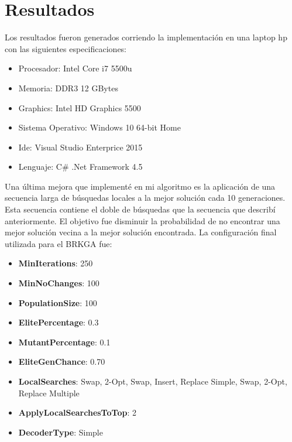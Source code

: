 \chapter{Resultados}

Los resultados fueron generados corriendo la implementación en una laptop hp con las siguientes especificaciones:

\begin{itemize}
  \item Procesador: Intel Core i7 5500u
  \item Memoria: DDR3 12 GBytes
  \item Graphics: Intel HD Graphics 5500
  \item Sistema Operativo: Windows 10 64-bit Home
  \item Ide: Visual Studio Enterprice 2015
  \item Lenguaje: C\# .Net Framework 4.5
\end{itemize}

\bigskip

Una última mejora que implementé en mi algoritmo es la aplicación de una secuencia larga de búsquedas locales a la mejor solución cada 10 generaciones. Esta secuencia contiene el doble de búsquedas que la secuencia que describí anteriormente. El objetivo fue disminuir la probabilidad de no encontrar una mejor solución vecina a la mejor solución encontrada. La configuración final utilizada para el BRKGA fue:

\begin{itemize}
  \item \textbf{MinIterations}: 250
  \item \textbf{MinNoChanges}: 100
  \item \textbf{PopulationSize}: 100
  \item \textbf{ElitePercentage}: 0.3 
  \item \textbf{MutantPercentage}: 0.1
  \item \textbf{EliteGenChance}: 0.70 
  \item \textbf{LocalSearches}: Swap, 2-Opt, Swap, Insert, Replace Simple, Swap, 2-Opt, Replace Multiple
  \item \textbf{ApplyLocalSearchesToTop}: 2
  \item \textbf{DecoderType}: Simple
\end{itemize}

\bigskip

